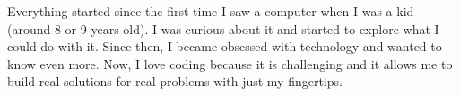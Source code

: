 
Everything started since the first time I saw a computer when I was a kid (around 8 or 9 years old). 
I was curious about it and started to explore what I could do with it. Since then, 
I became obsessed with technology and wanted to know even more.
Now, I love coding because it is challenging and it allows me to build real solutions 
for real problems with just my fingertips.